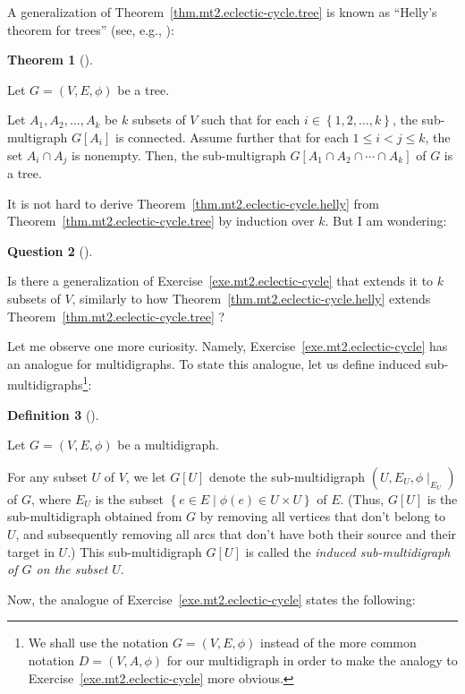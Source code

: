 \documentclass[numbers=enddot,12pt,final,onecolumn,notitlepage]{scrartcl}%
\theoremstyle{definition}
\newtheorem{theo}{Theorem}[section]
\newenvironment{theorem}[1][]
{\begin{theo}[#1]\begin{leftbar}}
{\end{leftbar}\end{theo}}
\newtheorem{defi}[theo]{Definition}
\newenvironment{definition}[1][]
{\begin{defi}[#1]\begin{leftbar}}
{\end{leftbar}\end{defi}}
\newtheorem{quest}[theo]{Question}
\newenvironment{algorithm}[1][]
{\begin{quest}[#1]\begin{leftbar}}
{\end{leftbar}\end{quest}}
\newcommand{\set}[1]{\left\{ #1 \right\}}
\newcommand{\tup}[1]{\left( #1 \right)}
\newcommand{\ive}[1]{\left[ #1 \right]}
\begin{document}
A generalization of Theorem~\ref{thm.mt2.eclectic-cycle.tree} is known
as ``Helly's theorem for trees'' (see, e.g.,
\cite[Theorem 4.1]{Horn71}):

\begin{theorem} \label{thm.mt2.eclectic-cycle.helly}
Let $G = \tup{V, E, \phi}$ be a tree.

Let $A_1, A_2, \ldots, A_k$ be $k$ subsets of $V$ such that
for each $i \in \set{1, 2, \ldots, k}$, the sub-multigraph
$G \ive{A_i}$ is connected.
Assume further that for each $1 \leq i < j \leq k$, the set
$A_i \cap A_j$ is nonempty.
Then, the sub-multigraph $G \ive{A_1 \cap A_2 \cap \cdots \cap A_k}$
of $G$ is a tree.
\end{theorem}

It is not hard to derive
Theorem~\ref{thm.mt2.eclectic-cycle.helly} from
Theorem~\ref{thm.mt2.eclectic-cycle.tree} by induction over $k$.
But I am wondering:

\begin{algorithm}
Is there a generalization of Exercise~\ref{exe.mt2.eclectic-cycle}
that extends it to $k$ subsets of $V$, similarly to how
Theorem~\ref{thm.mt2.eclectic-cycle.helly} extends
Theorem~\ref{thm.mt2.eclectic-cycle.tree} ?
\end{algorithm}

Let me observe one more curiosity.
Namely, Exercise~\ref{exe.mt2.eclectic-cycle} has an analogue for
multidigraphs.
To state this analogue, let us define induced
sub-multidigraphs\footnote{We shall use the notation
  $G = \tup{V, E, \phi}$ instead of the more common notation
  $D = \tup{V, A, \phi}$ for our multidigraph in order to make
  the analogy to Exercise~\ref{exe.mt2.eclectic-cycle} more
  obvious.}:

\begin{definition}
Let $G = \tup{V, E, \phi}$ be a multidigraph.

For any subset $U$ of $V$, we let $G \ive{U}$ denote the
sub-multidigraph $\tup{U, E_U, \phi\mid_{E_U}}$ of $G$, where
$E_U$ is the subset $\set{e \in E \mid \phi \tup{e} \in U \times U}$
of $E$.
(Thus, $G \ive{U}$ is the sub-multidigraph obtained from $G$ by
removing all vertices that don't belong to $U$, and subsequently
removing all arcs that don't have both their source and their target
in $U$.)
This sub-multidigraph $G \ive{U}$ is called the \textit{induced
sub-multidigraph of $G$ on the subset $U$}.
\end{definition}

Now, the analogue of Exercise~\ref{exe.mt2.eclectic-cycle} states
the following:
\end{document}
